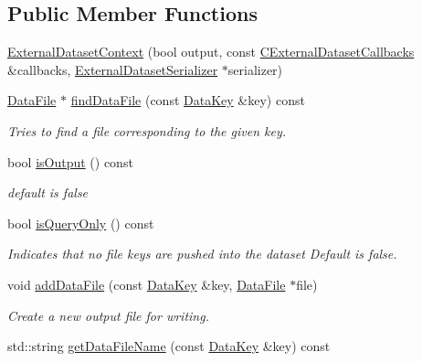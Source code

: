 \subsection*{Public Member Functions}
\begin{DoxyCompactItemize}
\item 
\hyperlink{classBUSBOY_1_1ExternalDatasetContext_a1f74c2b15f7b803acafbf7d1e956bb9e}{ExternalDatasetContext} (bool output, const \hyperlink{structCExternalDatasetCallbacksStruct}{CExternalDatasetCallbacks} \&callbacks, \hyperlink{classBUSBOY_1_1ExternalDatasetSerializer}{ExternalDatasetSerializer} $\ast$serializer)
\item 
\hyperlink{classBUSBOY_1_1DataFile}{DataFile} $\ast$ \hyperlink{classBUSBOY_1_1ExternalDatasetContext_a59835bb9652ace84e3962feb993e4801}{findDataFile} (const \hyperlink{classBUSBOY_1_1DataKey}{DataKey} \&key) const 
\begin{DoxyCompactList}\small\item\em Tries to find a file corresponding to the given key. \item\end{DoxyCompactList}\item 
bool \hyperlink{classBUSBOY_1_1ExternalDatasetContext_a6fef256e1e09e3bbed17daec4fbbed7b}{isOutput} () const 
\begin{DoxyCompactList}\small\item\em default is false \item\end{DoxyCompactList}\item 
bool \hyperlink{classBUSBOY_1_1ExternalDatasetContext_a85d83f0dffb7e0fbd8899de1abd28e85}{isQueryOnly} () const 
\begin{DoxyCompactList}\small\item\em Indicates that no file keys are pushed into the dataset Default is false. \item\end{DoxyCompactList}\item 
void \hyperlink{classBUSBOY_1_1ExternalDatasetContext_a26b99881ddf50b9956773a0ff390dd7b}{addDataFile} (const \hyperlink{classBUSBOY_1_1DataKey}{DataKey} \&key, \hyperlink{classBUSBOY_1_1DataFile}{DataFile} $\ast$file)
\begin{DoxyCompactList}\small\item\em Create a new output file for writing. \item\end{DoxyCompactList}\item 
std::string \hyperlink{classBUSBOY_1_1ExternalDatasetContext_a263a61c46130cbed03bd843637955f1a}{getDataFileName} (const \hyperlink{classBUSBOY_1_1DataKey}{DataKey} \&key) const 

\end{DoxyCompactItemize}
